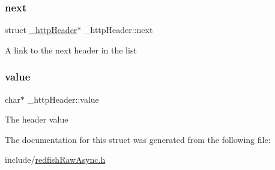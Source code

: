 \subsubsection{\texorpdfstring{next}{next}}
{\footnotesize\ttfamily struct \hyperlink{struct__httpHeader}{\+\_\+http\+Header}$\ast$ \+\_\+http\+Header\+::next}

A link to the next header in the list \mbox{\label{struct__httpHeader_aec035a6f64fa780f85bfedbf4f21cf2e}} 
\subsubsection{\texorpdfstring{value}{value}}
{\footnotesize\ttfamily char$\ast$ \+\_\+http\+Header\+::value}

The header value 

The documentation for this struct was generated from the following file\+:\begin{DoxyCompactItemize}
\item 
include/\hyperlink{redfishRawAsync_8h}{redfish\+Raw\+Async.\+h}\end{DoxyCompactItemize}
